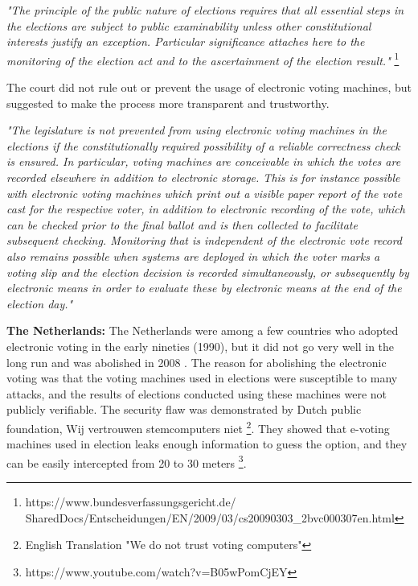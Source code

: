   \textit{"The principle of the public nature of elections requires that all 
  essential steps in the elections are subject to public examinability
  unless other constitutional interests justify an exception. 
  Particular significance attaches here to the monitoring of the 
  election act and to the ascertainment of the election result."}
  \footnote{https://www.bundesverfassungsgericht.de/
  SharedDocs/Entscheidungen/EN/2009/03/cs20090303\_2bvc000307en.html}
 
  \noindent	
  The court did not rule out or prevent the usage of electronic 
  voting machines,  but suggested to make the process more 
  transparent and trustworthy.  
  
  \textit{"The legislature is not prevented from using electronic voting machines 
  in the elections if the constitutionally required possibility of a 
  reliable correctness check is ensured. In particular, voting machines 
  are conceivable in which the votes are recorded elsewhere in addition
   to electronic storage. This is for instance possible with electronic
   voting machines which print out a visible paper report of the vote 
   cast for the respective voter, in addition to electronic recording 
   of the vote, which can be checked prior to the final ballot and is
    then collected to facilitate subsequent checking. Monitoring that is
     independent of the electronic vote record also remains possible when
     systems are deployed in which the voter marks a voting slip and the 
     election decision is recorded simultaneously, 
     or subsequently by electronic means in 
     order to evaluate these by electronic means at the end of the 
     election day."}
  
  \textbf{The Netherlands:}
  The Netherlands were among a few countries who adopted electronic voting 
  in the early nineties (1990), but it did not go very well in the long 
  run and was abolished in 2008 \citep{Jacobs2009}. 
  The reason for abolishing the electronic voting was that   
  the voting machines used in elections were susceptible to many attacks,
  and the results of elections conducted using these machines 
  were not publicly verifiable.  The security flaw was demonstrated by 
  Dutch public foundation, Wij vertrouwen stemcomputers niet
  \footnote{English Translation "We do not trust voting computers"}. 
  They showed that e-voting machines used in election leaks enough
  information to guess the option, 
  and they can be easily intercepted from 20 to 30 meters
  \footnote{https://www.youtube.com/watch?v=B05wPomCjEY}. 
  
